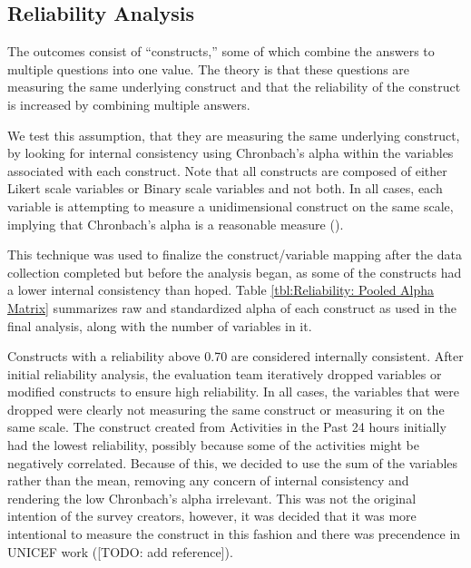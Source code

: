 \documentclass{article}
\begin{document}




\subsection*{Reliability Analysis}

The outcomes consist of ``constructs,'' some of which combine the answers to multiple questions into one value. The theory is that these questions are measuring the same underlying construct and that the reliability of the construct is increased by combining multiple answers.

We test this assumption, that they are measuring the same underlying construct, by looking for internal consistency using Chronbach's alpha within the variables associated with each construct. Note that all constructs are composed of either Likert scale variables or Binary scale variables and not both. In all cases, each variable is attempting to measure a unidimensional construct on the same scale, implying that Chronbach's alpha is a reasonable measure (\cite{Tavakol2011}).  

This technique was used to finalize the construct/variable mapping after the data collection completed but before the analysis began, as some of the constructs had a lower internal consistency than hoped. Table \ref{tbl:Reliability: Pooled Alpha Matrix} summarizes raw and standardized alpha of each construct as used in the final analysis, along with the number of variables in it.

Constructs with a reliability above 0.70 are considered internally consistent. After initial reliability analysis, the evaluation team iteratively dropped variables or modified constructs to ensure high reliability. In all cases, the variables that were dropped were clearly not measuring the same construct or measuring it on the same scale. The construct created from Activities in the Past 24 hours initially had the lowest reliability, possibly because some of the activities might be negatively correlated. Because of this, we decided to use the sum of the variables rather than the mean, removing any concern of internal consistency and rendering the low Chronbach's alpha irrelevant. This was not the original intention of the survey creators, however, it was decided that it was more intentional to measure the construct in this fashion and there was precendence in UNICEF work ([TODO: add reference]).  
\end{document}
